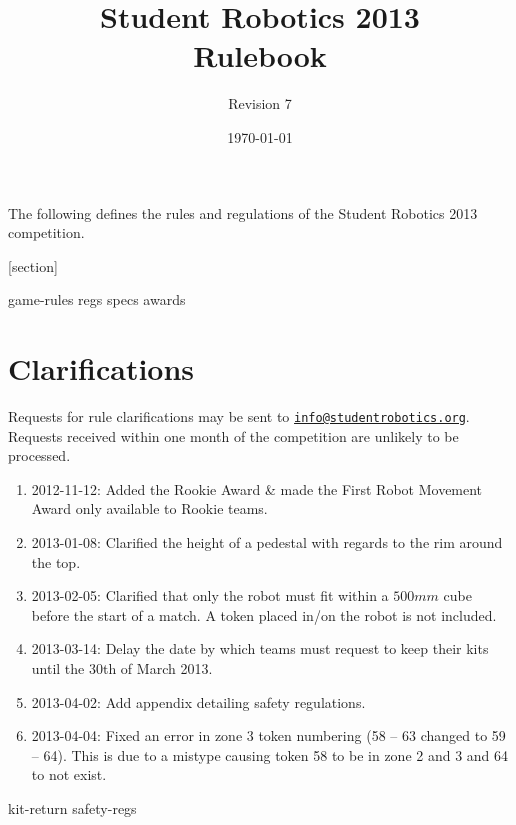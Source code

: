 \documentclass[a4paper, 11pt]{scrartcl}
\title {Student Robotics 2013\\ Rulebook}
\author{Revision 7}
\date{\today}
\begin{document}
\maketitle

\noindent The following defines the rules and regulations of the Student Robotics 2013 competition.

[section]
\newcommand{\rcn}{\stepcounter{rule}\arabic{section}.\arabic{rule}}
\renewcommand{\labelenumi}{\rcn}

 {game-rules}
\newpage
 {regs}
\newpage
 {specs}
\newpage
 {awards}

\renewcommand{\labelenumi}{\rcn}

\section{Clarifications}
Requests for rule clarifications may be sent to \href{mailto:info@studentrobotics.org}{\nolinkurl{info@studentrobotics.org}}.
Requests received within one month of the competition are unlikely to be processed.


\begin{enumerate}
\item 2012-11-12: Added the Rookie Award \& made the First Robot Movement Award only available to Rookie teams.
\item 2013-01-08: Clarified the height of a pedestal with regards to the rim around the top.
\item 2013-02-05: Clarified that only the robot must fit within a $500mm$ cube before the start of a match. A token placed in/on the robot is not included.
\item 2013-03-14: Delay the date by which teams must request to keep their kits until the 30th of March 2013.
\item 2013-04-02: Add appendix detailing safety regulations.
\item 2013-04-04: Fixed an error in zone 3 token numbering (58 -- 63 changed to 59 -- 64). This is due to a mistype causing token 58 to be in zone 2 and 3 and 64 to not exist.
\end{enumerate}

\newpage
\appendix
\appendixpage
\addappheadtotoc
 {kit-return}
 {safety-regs}
\end{document}
